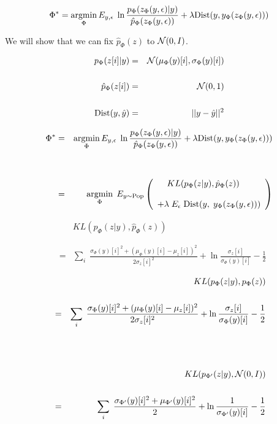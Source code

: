 {{

$$\Phi^* = \operatorname*{argmin}_\Phi E_{y,\epsilon}\;\ln \frac{p_\Phi(z_\Phi(y,\epsilon)|y)}{\hat{p}_\Phi(z_\Phi(y,\epsilon))} + \lambda \mathrm{Dist}(y,y_\Phi(z_\Phi(y,\epsilon)))$$

\vfill
We will show that we can fix $\hat{p}_\Phi(z)$ to ${\cal N}(0,I)$.

{\color{red}
\begin{eqnarray*}
p_\Phi(z[i]|y) & = & {\cal N}(\mu_\Phi(y)[i],\sigma_\Phi(y)[i]) \\
\\
\hat{p}_\Phi(z[i]) & = & {\cal N}(0,1) \\
\\
\mathrm{Dist}(y,\hat{y}) & = & ||y-\hat{y}||^2
\end{eqnarray*}
}



\begin{eqnarray*}
\Phi^* &  = & \operatorname*{argmin}_\Phi E_{y,\epsilon}\;\ln \frac{p_\Phi(z_\Phi(y,\epsilon)|y)}{\hat{p}_\Phi(z_\Phi(y,\epsilon))} + \lambda \mathrm{Dist}(y,y_\Phi(z_\Phi(y,\epsilon))) \\
\\
\\
& = & \operatorname*{argmin}_{\Phi}\;E_{y\sim \mathrm{Pop}} \left(\begin{array}{l}\;\;\;\;KL(p_\Phi(z|y),\hat{p}_\Phi(z)) \\
\\
+ \lambda \; E_\epsilon\;\mathrm{Dist}(y,\;y_\Phi(z_\Phi(y,\epsilon)))\end{array}\right)
\end{eqnarray*}


\begin{eqnarray*}
& & KL(p_\Phi(z|y),\hat{p}_\Phi(z)) \\
\\
\\
& = & \sum_i \;\frac{\sigma_\Phi(y)[i]^2 + (\mu_\Phi(y)[i]-\mu_z[i])^2}{2 \sigma_z[i]^2}
+ \ln\frac{\sigma_z[i]}{\sigma_\Phi(y)[i]} - \frac{1}{2}
\end{eqnarray*}



\begin{eqnarray*}
 &  & KL(p_\Phi(z|y),p_\Phi(z)) \\
 \\
 & = & \sum_i \;\frac{ \sigma_\Phi(y)[i]^2 +(\mu_\Phi(y)[i] - \mu_z[i])^2}{2\sigma_z[i]^2}
+ \ln\frac{\sigma_z[i]}{\sigma_\Phi(y)[i]}
- \frac{1}{2}
\\
\\
\\
\\
 &  & KL(p_{\Phi'}(z|y),{\cal N}(0,I)) \\
 \\
 & = & \sum_i \;\frac{\sigma_{\Phi'}(y)[i]^2 +\mu_{\Phi'}(y)[i]^2}{2} + \ln\frac{1}{\sigma_{\Phi'}(y)[i]} - \frac{1}{2}
\end{eqnarray*}

}}
